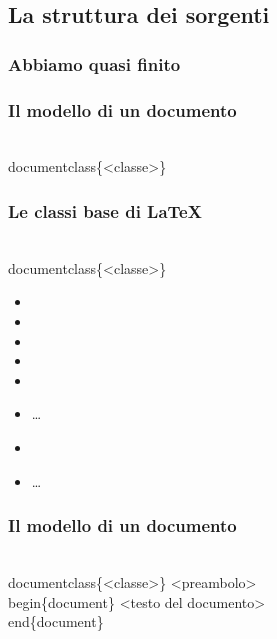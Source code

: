 \documentclass[svgnames,%
	ucs,%
	pdftex]{guitbeamer}
\begin{document}
\subsection{La struttura dei sorgenti}
\begin{frame}
  \frametitle{Abbiamo quasi finito}
\end{frame}
\begin{frame}
  \frametitle{Il modello di un documento}
	\begin{LaTeXcode}
		\\documentclass\{\alert{<classe>}\}
	\end{LaTeXcode}
\end{frame}
\begin{frame}
  \frametitle{Le classi base di \LaTeX}
	\begin{LaTeXcode}
		\\documentclass\{\alert{<classe>}\}
	\end{LaTeXcode}
	\begin{itemize}
		\item{}
		\item{}
		\item{}
		\item{}
		\item{}
		\item\dots
		\item{}
		\item\dots
	\end{itemize}
\end{frame}
\begin{frame}
  \frametitle{Il modello di un documento}
	\begin{LaTeXcode}
		\\documentclass\{\alert{<classe>}\}\n
	  \onslide<4->
		\hspace*{5ex}\alert{<preambolo>}\nn
	  \onslide<2->
		\\begin\{document\}\n
	  \onslide<3->
		\hspace*{5ex}\alert{<testo del documento>}\n
	  \onslide<2->
		\\end\{document\}
	\end{LaTeXcode}
\end{frame}
\end{document}
